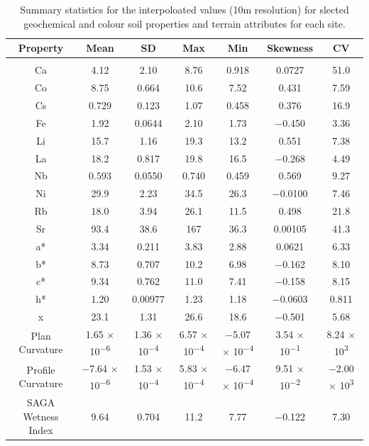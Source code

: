 \documentclass[
  number]{elsarticle}
\begin{document}
\begin{longtable}[]{@{}ccccccc@{}}

\caption{\label{tbl-univariate2-summary}Summary statistics for the
interpoloated values (10m resolution) for slected geochemical and colour
soil properties and terrain attributes for each site.}

\tabularnewline

\toprule\noalign{}
Property & Mean & SD & Max & Min & Skewness & CV \\
\midrule\noalign{}
\endhead
\bottomrule\noalign{}
\endlastfoot
\multicolumn{7}{@{}c@{}}{%
Agriculture} \\
Ca & 4.12 & 2.10 & 8.76 & 0.918 & 0.0727 & 51.0 \\
Co & 8.75 & 0.664 & 10.6 & 7.52 & 0.431 & 7.59 \\
Cs & 0.729 & 0.123 & 1.07 & 0.458 & 0.376 & 16.9 \\
Fe & 1.92 & 0.0644 & 2.10 & 1.73 & −0.450 & 3.36 \\
Li & 15.7 & 1.16 & 19.3 & 13.2 & 0.551 & 7.38 \\
La & 18.2 & 0.817 & 19.8 & 16.5 & −0.268 & 4.49 \\
Nb & 0.593 & 0.0550 & 0.740 & 0.459 & 0.569 & 9.27 \\
Ni & 29.9 & 2.23 & 34.5 & 26.3 & −0.0100 & 7.46 \\
Rb & 18.0 & 3.94 & 26.1 & 11.5 & 0.498 & 21.8 \\
Sr & 93.4 & 38.6 & 167 & 36.3 & 0.00105 & 41.3 \\
a* & 3.34 & 0.211 & 3.83 & 2.88 & 0.0621 & 6.33 \\
b* & 8.73 & 0.707 & 10.2 & 6.98 & −0.162 & 8.10 \\
c* & 9.34 & 0.762 & 11.0 & 7.41 & −0.158 & 8.15 \\
h* & 1.20 & 0.00977 & 1.23 & 1.18 & −0.0603 & 0.811 \\
x & 23.1 & 1.31 & 26.6 & 18.6 & −0.501 & 5.68 \\
Plan Curvature & 1.65 × 10\textsuperscript{−6} & 1.36 ×
10\textsuperscript{−4} & 6.57 × 10\textsuperscript{−4} & −5.07 ×
10\textsuperscript{−4} & 3.54 × 10\textsuperscript{−1} & 8.24 ×
10\textsuperscript{3} \\
Profile Curvature & −7.64 × 10\textsuperscript{−6} & 1.53 ×
10\textsuperscript{−4} & 5.83 × 10\textsuperscript{−4} & −6.47 ×
10\textsuperscript{−4} & 9.51 × 10\textsuperscript{−2} & −2.00 ×
10\textsuperscript{3} \\
SAGA Wetness Index & 9.64 & 0.704 & 11.2 & 7.77 & −0.122 & 7.30 \\

\end{longtable}
\end{document}
